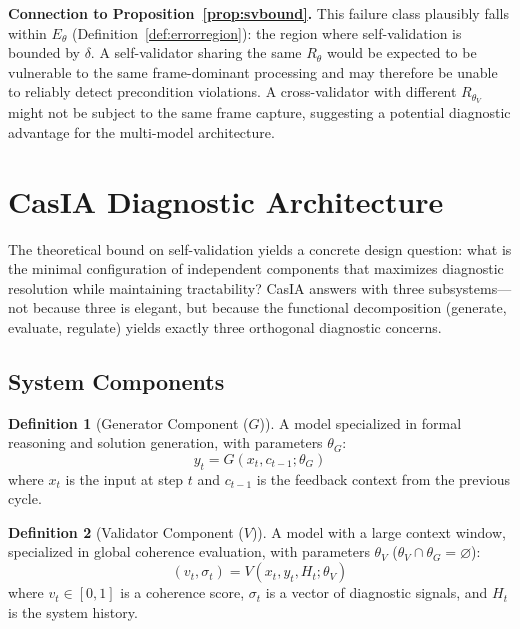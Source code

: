 \documentclass[11pt,a4paper]{article}
\theoremstyle{definition}
\newtheorem{definition}{Definition}[section]
\newcommand{\Rtheta}{R_\theta}
\newcommand{\thetaG}{\theta_G}
\newcommand{\thetaV}{\theta_V}
\begin{document}
\textbf{Connection to Proposition~\ref{prop:svbound}.} This failure class plausibly falls within $E_\theta$ (Definition~\ref{def:errorregion}): the region where self-validation is bounded by $\delta$. A self-validator sharing the same $\Rtheta$ would be expected to be vulnerable to the same frame-dominant processing and may therefore be unable to reliably detect precondition violations. A cross-validator with different $R_{\thetaV}$ might not be subject to the same frame capture, suggesting a potential diagnostic advantage for the multi-model architecture.


\section{CasIA Diagnostic Architecture}
\label{sec:architecture}

The theoretical bound on self-validation yields a concrete design question: what is the minimal configuration of independent components that maximizes diagnostic resolution while maintaining tractability? CasIA answers with three subsystems---not because three is elegant, but because the functional decomposition (generate, evaluate, regulate) yields exactly three orthogonal diagnostic concerns.

\subsection{System Components}

\begin{definition}[Generator Component ($G$)]
A model specialized in formal reasoning and solution generation, with parameters $\thetaG$:
\begin{equation}
y_t = G(x_t, c_{t-1}; \thetaG)
\end{equation}
where $x_t$ is the input at step $t$ and $c_{t-1}$ is the feedback context from the previous cycle.
\end{definition}

\begin{definition}[Validator Component ($V$)]
A model with a large context window, specialized in global coherence evaluation, with parameters $\thetaV$ ($\thetaV \cap \thetaG = \varnothing$):
\begin{equation}
(v_t, \sigma_t) = V(x_t, y_t, H_t; \thetaV)
\end{equation}
where $v_t \in [0,1]$ is a coherence score, $\sigma_t$ is a vector of diagnostic signals, and $H_t$ is the system history.
\end{definition}
\end{document}
